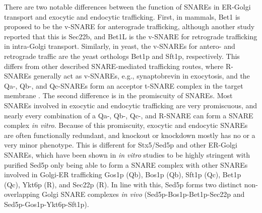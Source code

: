 There are two notable differences between the function of SNAREs in ER-Golgi transport and exocytic and endocytic trafficking. First, in mammals, Bet1 is proposed to be the v-SNARE for anterograde trafficking\cite{malsam_organization_2011,zhang_mammalian_1997,xu_gs15_2002,volchuk_countercurrent_2004,tai_participation_2004}, although another study reported that this is Sec22b\cite{xu_subunit_2000}, and Bet1L is the v-SNARE for retrograde trafficking in intra-Golgi transport\cite{malsam_organization_2011,zhang_mammalian_1997,xu_gs15_2002,volchuk_countercurrent_2004,tai_participation_2004}. Similarly, in yeast, the v-SNAREs for antero- and retrograde traffic are the yeast orthologs Bet1p and Sft1p, respectively\cite{parlati_distinct_2002,banfield_snare-like_1995,parlati_topological_2000}. This differs from other described SNARE-mediated trafficking routes, where R-SNAREs generally act as v-SNAREs, e.g., synaptobrevin in exocytosis, and the Qa-, Qb-, and Qc-SNAREs form an acceptor t-SNARE complex in the target membrane \cite{dingjan_endosomal_2018,hong_snares_2005,jahn_snares_2006}. The second difference is in the promiscuity of SNAREs. Most SNAREs involved in exocytic and endocytic trafficking are very promiscuous, and nearly every combination of a Qa-, Qb-, Qc-, and R-SNARE can form a SNARE complex \emph{in vitro}\cite{dingjan_endosomal_2018}. Because of this promiscuity, exocytic and endocytic SNAREs are often functionally redundant, and knockout or knockdown mostly has no or a very minor phenotype\cite{dingjan_endosomal_2018}. This is different for Stx5/Sed5p and other ER-Golgi SNAREs, which have been shown in \emph{in vitro} studies to be highly stringent with purified Sed5p only being able to form a SNARE complex with other SNAREs involved in Golgi-ER trafficking Gos1p (Qb), Bos1p (Qb), Sft1p (Qc), Bet1p (Qc), Ykt6p (R), and Sec22p (R)\cite{furukawa_multiple_2014,tsui_selective_2001}. In line with this, Sed5p forms two distinct non-overlapping Golgi SNARE complexes \emph{in vivo} (Sed5p-Bos1p-Bet1p-Sec22p and Sed5p-Gos1p-Ykt6p-Sft1p)\cite{parlati_distinct_2002}.

